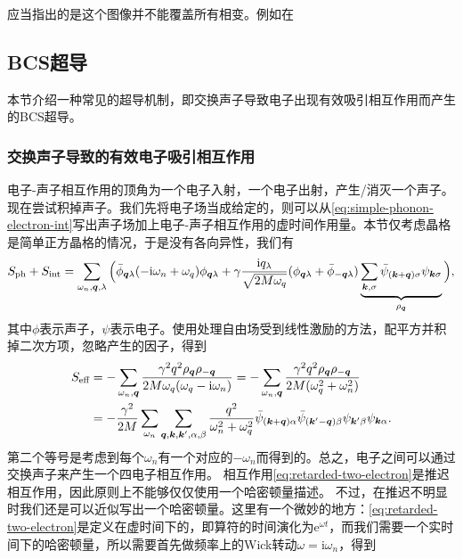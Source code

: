 \documentclass[hyperref, UTF8, a4paper]{ctexart}
\newcommand*{\ii}{\mathrm{i}}
\newcommand*{\ee}{\mathrm{e}}
\begin{document}
应当指出的是这个图像并不能覆盖所有相变。例如在

\subsection{BCS超导}

本节介绍一种常见的超导机制，即交换声子导致电子出现有效吸引相互作用而产生的BCS超导。

\subsubsection{交换声子导致的有效电子吸引相互作用}\label{sec:phonon-caused-interaction}

电子-声子相互作用的顶角为一个电子入射，一个电子出射，产生/消灭一个声子。
现在尝试积掉声子。我们先将电子场当成给定的，则可以从\eqref{eq:simple-phonon-electron-int}写出声子场加上电子-声子相互作用的虚时间作用量。本节仅考虑晶格是简单正方晶格的情况，于是没有各向异性，我们有
\[
    S_\text{ph} + S_\text{int} = \sum_{\omega_n, \vb*{q}, \lambda} \Big(
        \bar{\phi}_{\vb*{q} \lambda} (- \ii \omega_n + \omega_q) \phi_{\vb*{q} \lambda}
        + \gamma \frac{\ii q_\lambda}{\sqrt{2 M \omega_q}} (\phi_{\vb*{q} \lambda} + \bar{\phi}_{-\vb*{q} \lambda}) \underbrace{\sum_{\vb*{k}, \sigma} \bar{\psi}_{(\vb*{k} + \vb*{q}) \sigma} \psi_{\vb*{k} \sigma}}_{\rho_{\vb*{q}}}
    \Big),
\]
其中$\phi$表示声子，$\psi$表示电子。使用处理自由场受到线性激励的方法，配平方并积掉二次方项，忽略产生的因子，得到
\begin{equation}
    \begin{aligned}
        S_\text{eff} &= - \sum_{\omega_n, \vb*{q}} \frac{\gamma^2 q^2 \rho_{\vb*{q}} \rho_{-\vb*{q}}}{2 M \omega_q (\omega_q - \ii \omega_n)} 
        = - \sum_{\omega_n, \vb*{q}} \frac{\gamma^2 q^2 \rho_{\vb*{q}} \rho_{-\vb*{q}}}{2 M (\omega_q^2 + \omega_n^2)} \\ 
        &= - \frac{\gamma^2}{2 M} \sum_{\omega_n} \sum_{\vb*{q}, \vb*{k}, \vb*{k}', \alpha, \beta} \frac{q^2}{\omega_n^2 + \omega_q^2} \bar{\psi}_{(\vb*{k}+\vb*{q}) \alpha} \bar{\psi}_{(\vb*{k}' - \vb*{q}) \beta} \psi_{\vb*{k}' \beta} \psi_{\vb*{k} \alpha} .
    \end{aligned}
    \label{eq:retarded-two-electron}
\end{equation}
第二个等号是考虑到每个$\omega_n$有一个对应的$-\omega_n$而得到的。总之，电子之间可以通过交换声子来产生一个四电子相互作用。
相互作用\eqref{eq:retarded-two-electron}是推迟相互作用，因此原则上不能够仅仅使用一个哈密顿量描述。
不过，在推迟不明显时我们还是可以近似写出一个哈密顿量。这里有一个微妙的地方：\eqref{eq:retarded-two-electron}是定义在虚时间下的，即算符的时间演化为$\ee^{\omega t}$，而我们需要一个实时间下的哈密顿量，所以需要首先做频率上的Wick转动$\omega = \ii \omega_n$，得到
\end{document}

